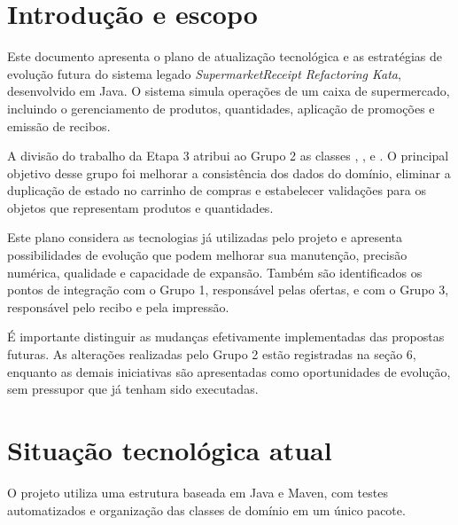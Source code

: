 
\graphicspath{{../../}}



\tableofcontents\newpage

\section{Introdução e escopo}

Este documento apresenta o plano de atualização tecnológica e as estratégias de evolução futura do sistema legado \textit{SupermarketReceipt Refactoring Kata}, desenvolvido em Java. O sistema simula operações de um caixa de supermercado, incluindo o gerenciamento de produtos, quantidades, aplicação de promoções e emissão de recibos.

A divisão do trabalho da Etapa 3 atribui ao Grupo 2 as classes , ,  e . O principal objetivo desse grupo foi melhorar a consistência dos dados do domínio, eliminar a duplicação de estado no carrinho de compras e estabelecer validações para os objetos que representam produtos e quantidades.

Este plano considera as tecnologias já utilizadas pelo projeto e apresenta possibilidades de evolução que podem melhorar sua manutenção, precisão numérica, qualidade e capacidade de expansão. Também são identificados os pontos de integração com o Grupo 1, responsável pelas ofertas, e com o Grupo 3, responsável pelo recibo e pela impressão.

É importante distinguir as mudanças efetivamente implementadas das propostas futuras. As alterações realizadas pelo Grupo 2 estão registradas na seção 6, enquanto as demais iniciativas são apresentadas como oportunidades de evolução, sem pressupor que já tenham sido executadas.

\section{Situação tecnológica atual}

O projeto utiliza uma estrutura baseada em Java e Maven, com testes automatizados e organização das classes de domínio em um único pacote.

